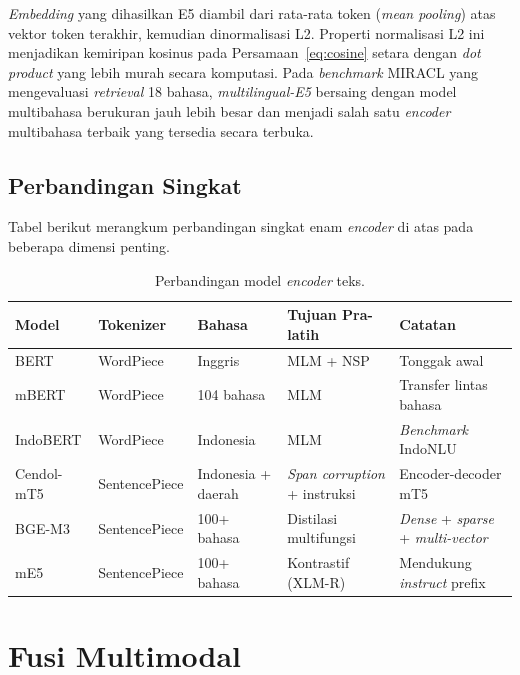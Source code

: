\textit{Embedding} yang dihasilkan E5 diambil dari rata-rata token (\textit{mean pooling}) atas vektor token terakhir, kemudian dinormalisasi L2. Properti normalisasi L2 ini menjadikan kemiripan kosinus pada Persamaan~\ref{eq:cosine} setara dengan \textit{dot product} yang lebih murah secara komputasi. Pada \textit{benchmark} MIRACL yang mengevaluasi \textit{retrieval} 18 bahasa, \textit{multilingual-E5} bersaing dengan model multibahasa berukuran jauh lebih besar dan menjadi salah satu \textit{encoder} multibahasa terbaik yang tersedia secara terbuka.

\subsection{Perbandingan Singkat}

Tabel berikut merangkum perbandingan singkat enam \textit{encoder} di atas pada beberapa dimensi penting.

\begin{table}[htbp]
\centering
\caption{Perbandingan model \textit{encoder} teks.}
\label{tab:textencoder}
\begin{tabular}{p{2.4cm} p{2.2cm} p{2.4cm} p{2.6cm} p{2.6cm}}
\toprule
\textbf{Model} & \textbf{Tokenizer} & \textbf{Bahasa} & \textbf{Tujuan Pra-latih} & \textbf{Catatan} \\
\midrule
BERT & WordPiece & Inggris & MLM + NSP & Tonggak awal \\
mBERT & WordPiece & 104 bahasa & MLM & Transfer lintas bahasa \\
IndoBERT & WordPiece & Indonesia & MLM & \textit{Benchmark} IndoNLU \\
Cendol-mT5 & SentencePiece & Indonesia + daerah & \textit{Span corruption} + instruksi & Encoder-decoder mT5 \\
BGE-M3 & SentencePiece & 100+ bahasa & Distilasi multifungsi & \textit{Dense} + \textit{sparse} + \textit{multi-vector} \\
mE5 & SentencePiece & 100+ bahasa & Kontrastif (XLM-R) & Mendukung \textit{instruct} prefix \\
\bottomrule
\end{tabular}
\end{table}

\section{Fusi Multimodal}
\label{sec:fusion}

